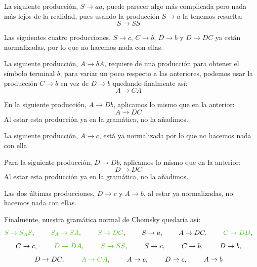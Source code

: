 \documentclass[10pt,a4paper,spanish]{report}
\begin{document}
\begin{enumerate}[a)]
La siguiente producción, $S \rightarrow aa$, puede parecer algo más complicada pero nada más lejos de la realidad, pues usando la producción $S \rightarrow a$ la tenemos resuelta:
\begin{displaymath}
  S \rightarrow SS
\end{displaymath}

Las siguientes cuatro producciones, $S \rightarrow c$, $C \rightarrow b$, $D \rightarrow b$ y $D \rightarrow DC$ ya están normalizadas, por lo que no hacemos nada con ellas.

La siguiente producción, $A \rightarrow bA$, requiere de una producción para obtener el símbolo terminal $b$, para variar un poco respecto a las anteriores, podemos usar la producción $C \rightarrow b$ en vez de $D \rightarrow b$ quedando finalmente así:
\begin{displaymath}
  A \rightarrow CA
\end{displaymath}

En la siguiente producción, $A \rightarrow Db$, aplicamos lo mismo que en la anterior:
\begin{displaymath}
  A \rightarrow DC
\end{displaymath}
Al estar esta producción ya en la gramática, no la añadimos.

La siguiente producción, $A \rightarrow c$, está ya normalizada por lo que no hacemos nada con ella.

Para la siguiente producción, $D \rightarrow Db$, aplicamos lo mismo que en la anterior:
\begin{displaymath}
  D \rightarrow DC
\end{displaymath}
Al estar esta producción ya en la gramática, no la añadimos.

Las dos últimas producciones, $D \rightarrow c$ y $A \rightarrow b$, al estar ya normalizadas, no hacemos nada con ellas.


Finalmente, nuestra gramática normal de Chomsky quedaría así:
\begin{displaymath}
  \textcolor{p9}{S \rightarrow S_A S}, \qquad\ \textcolor{p9}{S_A \rightarrow SA}, \qquad\ \textcolor{p9}{S \rightarrow DC}, \qquad\ S \rightarrow a, \qquad\ A \rightarrow DC, \qquad\ \textcolor{p9}{C \rightarrow DD},
\end{displaymath}
\begin{displaymath}
  C \rightarrow c, \qquad\ \textcolor{p9}{D \rightarrow DA}, \qquad\ \textcolor{p9}{S \rightarrow SS}, \qquad\ S \rightarrow c, \qquad\ C \rightarrow b, \qquad\ D \rightarrow b,
\end{displaymath}
\begin{displaymath}
  D \rightarrow DC, \qquad\ \textcolor{p9}{A \rightarrow CA}, \qquad\ A \rightarrow c, \qquad\ D \rightarrow c, \qquad\ A \rightarrow b
\end{displaymath}

\end{enumerate}
\end{document}
